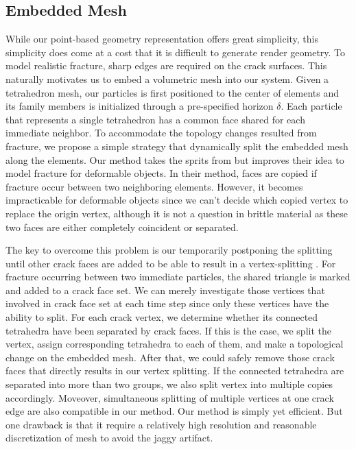 \subsection{Embedded Mesh}
While our point-based geometry representation offers great simplicity, this simplicity does come at a cost that it is difficult to generate render geometry. To model realistic fracture, sharp edges are required on the crack surfaces. This naturally motivates us to embed a volumetric mesh into our system.
Given a tetrahedron mesh, our particles is first positioned to the center of elements and its family members is initialized through a pre-specified horizon $\delta$.
Each particle that represents a single tetrahedron has a common face shared for each immediate neighbor.
To accommodate the topology changes resulted from fracture, we propose a simple strategy that dynamically split the embedded mesh along the elements.
Our method takes the sprits from \cite{Chen2013} but improves their idea to model fracture for deformable objects.
In their method, faces are copied if fracture occur between two neighboring elements.
However, it becomes impracticable for deformable objects since we can't decide which copied vertex to replace the origin vertex,
although it is not a question in brittle material as these two faces are either completely coincident or separated.

The key to overcome this problem is our temporarily postponing the splitting until other crack faces are added to be able to result in a vertex-splitting .
For fracture occurring between two immediate particles, the shared triangle is marked and added to a crack face set.
We can merely investigate those vertices that involved in crack face set at each time step since only these vertices have the ability to split.
For each crack vertex, we determine whether its connected tetrahedra have been separated by crack faces.
If this is the case, we split the vertex, assign corresponding tetrahedra to each of them, and make a topological change on the embedded mesh.
After that, we could safely remove those crack faces that directly results in our vertex splitting.
If the connected tetrahedra are separated into more than two groups, we also split vertex into multiple copies accordingly.
Moveover, simultaneous splitting of multiple vertices at one crack edge are also compatible in our method.
Our method is simply yet efficient.
But one drawback is that it require a relatively high resolution and reasonable discretization of mesh to avoid the jaggy artifact.

